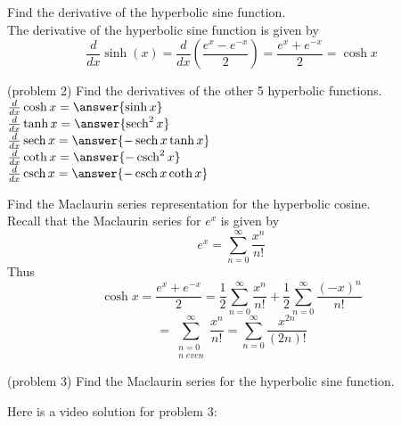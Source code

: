 \documentclass[handout]{ximera}
\begin{document}
\begin{example}[example 2]
Find the derivative of the hyperbolic sine function.\\
The derivative of the hyperbolic sine function is given by
\[
\frac{d}{dx} \sinh(x) = \frac{d}{dx} \left( \frac{e^x -e^{-x}}{2} \right) = \frac{e^x + e^{-x}}{2} = \cosh x
\]
\end{example}

\begin{problem}(problem 2)
Find the derivatives of the other 5 hyperbolic functions.\\
$\frac{d}{dx} \cosh x = \answer{\sinh x}$\\
$\frac{d}{dx} \tanh x = \answer{\sech^2 x}$\\
$\frac{d}{dx} \sech x = \answer{-\sech x \tanh x}$\\
$\frac{d}{dx} \coth x = \answer{-\csch^2 x}$\\
$\frac{d}{dx} \csch x = \answer{-\csch x \coth x}$
\end{problem}


\begin{example}[example 3]
Find the Maclaurin series representation for the hyperbolic cosine.\\
Recall that the Maclaurin series for $e^x$ is given by
\[
e^x = \sum_{n=0}^\infty \frac{x^n}{n!}
\]
Thus
\[
\cosh x = \frac{e^x + e^{-x}}{2} = \frac12 \sum_{n=0}^\infty \frac{x^n}{n!} + \frac12 \sum_{n=0}^\infty \frac{(-x)^n}{n!}
\]
\[
= \sum_{\substack{n=0\\ n\; even}}^\infty \frac{x^n}{n!} = \sum_{n=0}^\infty \frac{x^{2n}}{(2n)!}
\]

\end{example}

\begin{problem}(problem 3)
Find the Maclaurin series for the hyperbolic sine function.\\

\begin{multipleChoice}
\end{multipleChoice}
\end{problem}

Here is a video solution for problem 3:\\
\begin{foldable}
\end{foldable}
\end{document}
